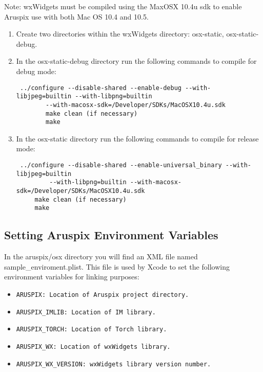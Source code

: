 \documentclass[]{article}
\begin{document}
Note: wxWidgets must be compiled using the MaxOSX 10.4u sdk to enable Aruspix
use with both Mac OS 10.4 and 10.5.
\begin{enumerate}
	\item Create two directories within the wxWidgets directory: osx-static, osx-static-debug.
	\item In the osx-static-debug directory run the following commands to compile for debug mode:
	\begin{verbatim} ../configure --disable-shared --enable-debug --with-libjpeg=builtin --with-libpng=builtin 
     	--with-macosx-sdk=/Developer/SDKs/MacOSX10.4u.sdk
 		make clean (if necessary)
 		make
	\end{verbatim}

	\item In the osx-static directory run the following commands to compile for release mode:
	\begin{verbatim} ../configure --disable-shared --enable-universal_binary --with-libjpeg=builtin
	     --with-libpng=builtin --with-macosx-sdk=/Developer/SDKs/MacOSX10.4u.sdk 
	 make clean (if necessary)
	 make
	\end{verbatim}
\end{enumerate}


\subsection{Setting Aruspix Environment Variables}
	In the aruspix/osx directory you will find an XML file named sample_enviroment.plist. This
	file is used by Xcode to set the following environment variables for linking purposes:
	\begin{itemize}
		\item \begin{verbatim}ARUSPIX: Location of Aruspix project directory.\end{verbatim}
		\item \begin{verbatim}ARUSPIX_IMLIB: Location of IM library.\end{verbatim}
		\item \begin{verbatim}ARUSPIX_TORCH: Location of Torch library.\end{verbatim}
		\item \begin{verbatim}ARUSPIX_WX: Location of wxWidgets library.\end{verbatim}
		\item \begin{verbatim}ARUSPIX_WX_VERSION: wxWidgets library version number.\end{verbatim}
	\end{itemize}
\end{document}
